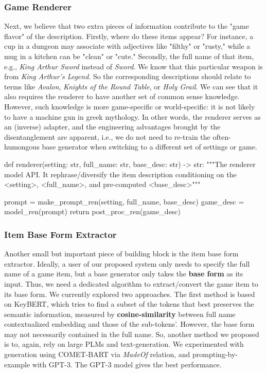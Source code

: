 \documentclass[12pt]{article}
\begin{document}
    \subsubsection{Game Renderer}
    Next, we believe that two extra pieces of information contribute to the "game flavor" 
      of the description. Firstly, where do these items appear? For instance, a cup in a 
      dungeon may associate with adjectives like "filthy" or "rusty," while a mug in a 
      kitchen can be "clean" or "cute." Secondly, the full name of that item, e.g., 
      \textit{King Arthur Sword} instead of \textit{Sword}. We know that this particular weapon is from 
      \textit{King Arthur's Legend}. So the corresponding descriptions should relate to terms like 
      \textit{Avalon}, \textit{Knights of the Round Table}, or \textit{Holy Grail}. We can see that it also requires 
      the renderer to have another set of common sense knowledge. However, such knowledge 
      is more game-specific or world-specific: it is not likely to have a machine gun in 
      greek mythology. In other words, the renderer serves as an (inverse) adapter, and 
      the engineering advantages brought by the disentanglement are apparent, i.e., we do 
      not need to re-train the often-humongous base generator when switching to a different 
      set of settings or game. 
      \begin{python}

        def renderer(setting: str, full_name: str, base_desc: str) -> str:
            """The renderer model API. It rephrase/diversify the item 
                description conditioning on the <setting>, <full_name>, 
                and pre-computed <base_desc>"""

            prompt = make_prompt_ren(setting, full_name, base_desc)
            game_desc = model_ren(prompt)
            return post_proc_ren(game_desc)
      \end{python}

    \subsubsection{Item Base Form Extractor}
    Another small but important piece of building block is the item base form extractor. 
      Ideally, a user of our proposed system only needs to specify the full name of a game 
      item, but a base generator only takes the \textbf{base form} as its input. Thus, we 
      need a dedicated algorithm to extract/convert the game item to its base form. We 
      currently explored two approaches. The first method is based on KeyBERT, which 
      tries to find a subset of the tokens that best preserves the semantic information, measured 
      by \textbf{cosine-similarity} between full name contextualized embedding and those of the sub-tokens'. However, the base form may not necessarily contained in the full name. So, another
      method we proposed is to, again, rely on large PLMs and text-generation. We experimented 
      with generation using COMET-BART via \textit{MadeOf} relation, and prompting-by-example with 
      GPT-3. The GPT-3 model gives the best performance.
  
\end{document}
